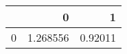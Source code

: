 \begin{tabular}{lrr}
\toprule
{} &         0 &        1 \\
\midrule
0 &  1.268556 &  0.92011 \\
\bottomrule
\end{tabular}
